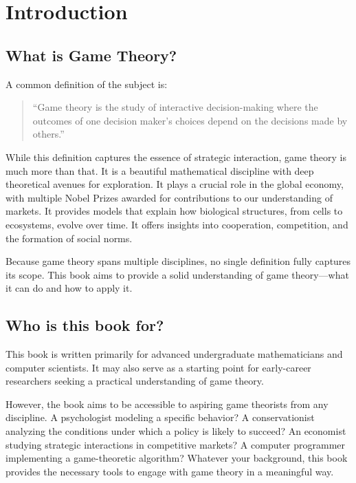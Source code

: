 \chapter{Introduction}\label{chapter:introduction}

\section{What is Game Theory?}

A common definition of the subject is:

\begin{quote} 
``Game theory is the study of interactive decision-making where
the outcomes of one decision maker’s choices depend on the decisions made by
others.'' 
\end{quote}

While this definition captures the essence of strategic interaction, game theory
is much more than that. It is a beautiful mathematical discipline with deep
theoretical avenues for exploration. It plays a crucial role in the global
economy, with multiple Nobel Prizes awarded for contributions to our
understanding of markets. It provides models that explain how biological
structures, from cells to ecosystems, evolve over time. It offers insights into
cooperation, competition, and the formation of social norms.

Because game theory spans multiple disciplines, no single definition fully
captures its scope. This book aims to provide a solid understanding of game
theory—what it can do and how to apply it.

\section{Who is this book for?}

This book is written primarily for advanced undergraduate mathematicians and
computer scientists. It may also serve as a starting point for early-career
researchers seeking a practical understanding of game theory.  

However, the book aims to be accessible to aspiring game theorists from any
discipline. A psychologist modeling a specific behavior? A conservationist
analyzing the conditions under which a policy is likely to succeed? An economist
studying strategic interactions in competitive markets? A computer programmer
implementing a game-theoretic algorithm? Whatever your background, this book
provides the necessary tools to engage with game theory in a meaningful way.  

